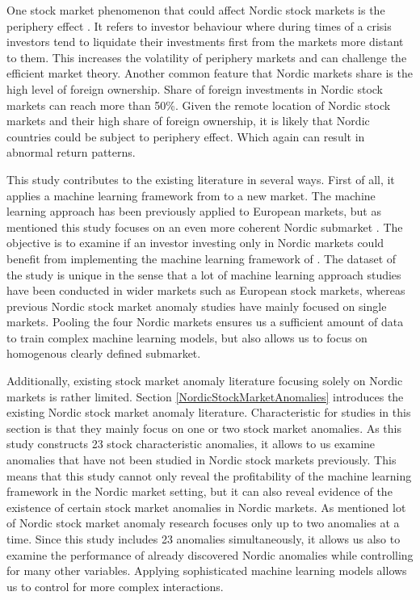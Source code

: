 \documentclass[12pt]{article}
\begin{document}
One stock market phenomenon that could affect Nordic stock markets is the periphery effect \citep{leivo2011}. It refers to investor behaviour where during times of a crisis investors tend to liquidate their investments first from the markets more distant to them. This increases the volatility of periphery markets and can challenge the efficient market theory. Another common feature that Nordic markets share is the high level of foreign ownership. Share of foreign investments in Nordic stock markets can reach more than 50\%\footnotemark. Given the remote location of Nordic stock markets and their high share of foreign ownership, it is likely that Nordic countries could be subject to periphery effect. Which again can result in abnormal return patterns. \par


This study contributes to the existing literature in several ways. First of all, it applies a machine learning framework from \citet{guetal} to a new market. The machine learning approach has been previously applied to European markets, but as mentioned this study focuses on an even more coherent Nordic submarket \citep{Drobetz, Fieberg}. The objective is to examine if an investor investing only in Nordic markets could benefit from implementing the machine learning framework of \citet{guetal}. The dataset of the study is unique in the sense that a lot of machine learning approach studies have been conducted in wider markets such as European stock markets, whereas previous Nordic stock market anomaly studies have mainly focused on single markets. Pooling the four Nordic markets ensures us a sufficient amount of data to train complex machine learning models, but also allows us to focus on homogenous clearly defined submarket. \par

Additionally, existing stock market anomaly literature focusing solely on Nordic markets is rather limited. Section \ref{NordicStockMarketAnomalies} introduces the existing Nordic stock market anomaly literature. Characteristic for studies in this section is that they mainly focus on one or two stock market anomalies. As this study constructs 23 stock characteristic anomalies, it allows to us examine anomalies that have not been studied in Nordic stock markets previously. This means that this study cannot only reveal the profitability of the machine learning framework in the Nordic market setting, but it can also reveal evidence of the existence of certain stock market anomalies in Nordic markets. As mentioned lot of Nordic stock market anomaly research focuses only up to two anomalies at a time. Since this study includes 23 anomalies simultaneously, it allows us also to examine the performance of already discovered Nordic anomalies while controlling for many other variables. Applying sophisticated machine learning models allows us to control for more complex interactions. \par
\end{document}
